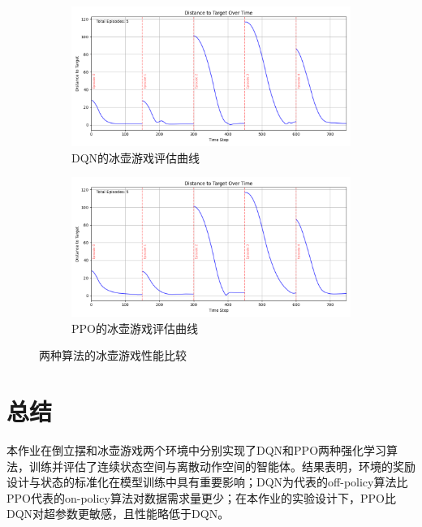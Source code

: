 \documentclass[12pt,a4paper]{article}
\begin{document}
\begin{figure}[htbp!]
    \centering
    \begin{subfigure}[b]{0.49\textwidth}
        \centering
        \includegraphics[width=\textwidth]{images/curling_dqn_eval.png}
        \caption{DQN的冰壶游戏评估曲线}
        \label{fig:curling_dqn_eval}
    \end{subfigure}
    \hfill
    \begin{subfigure}[b]{0.49\textwidth}
        \centering
        \includegraphics[width=\textwidth]{images/curling_ppo_eval.png}
        \caption{PPO的冰壶游戏评估曲线}
        \label{fig:curling_ppo_eval}
    \end{subfigure}
    \caption{两种算法的冰壶游戏性能比较}
    \label{fig:curling_all_eval}
\end{figure}

\section{总结}
\label{sec:conclusion}
本作业在倒立摆和冰壶游戏两个环境中分别实现了DQN和PPO两种强化学习算法，训练并评估了连续状态空间与离散动作空间的智能体。结果表明，环境的奖励设计与状态的标准化在模型训练中具有重要影响；DQN为代表的off-policy算法比PPO代表的on-policy算法对数据需求量更少；在本作业的实验设计下，PPO比DQN对超参数更敏感，且性能略低于DQN。

\end{document}
